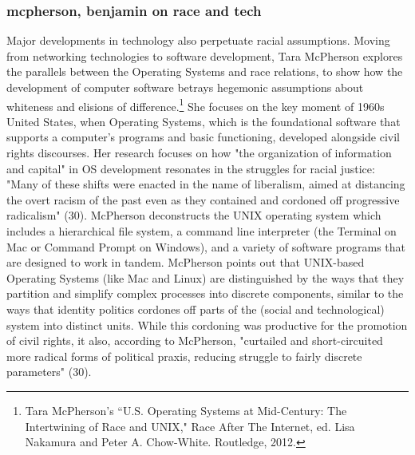 \documentclass[11pt]{article}
\begin{document}
\subsubsection{mcpherson, benjamin on race and tech}
\label{sec:orga575198}
Major developments in technology also perpetuate racial
assumptions. Moving from networking technologies to software
development, Tara McPherson explores the parallels between the
Operating Systems and race relations, to show how the development of
computer software betrays hegemonic assumptions about whiteness and
elisions of difference.\footnote{Tara McPherson’s “U.S. Operating Systems at Mid-Century: The
Intertwining of Race and UNIX," Race After The Internet, ed. Lisa
Nakamura and Peter A. Chow-White. Routledge, 2012.} She focuses on the key moment of 1960s
United States, when Operating Systems, which is the foundational
software that supports a computer's programs and basic functioning,
developed alongside civil rights discourses. Her research focuses on
how "the organization of information and capital" in OS development
resonates in the struggles for racial justice: "Many of these shifts
were enacted in the name of liberalism, aimed at distancing the overt
racism of the past even as they contained and cordoned off progressive
radicalism" (30). McPherson deconstructs the UNIX operating system
which includes a hierarchical file system, a command line interpreter
(the Terminal on Mac or Command Prompt on Windows), and a variety of
software programs that are designed to work in tandem. McPherson
points out that UNIX-based Operating Systems (like Mac and Linux) are
distinguished by the ways that they partition and simplify complex
processes into discrete components, similar to the ways that identity
politics cordones off parts of the (social and technological) system
into distinct units. While this cordoning was productive for the
promotion of civil rights, it also, according to McPherson, "curtailed
and short-circuited more radical forms of political praxis, reducing
struggle to fairly discrete parameters" (30).
\end{document}
